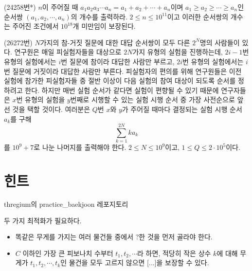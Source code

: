 \begin{problem}
    (24258번*) $n$이 주어질 때 $a_1 a_2 a_3 \cdots a_n = a_1 + a_2 + \cdots + a_n$이며 $a_1 \geq a_2 \geq \cdots \geq a_n$인 순서쌍 $(a_1, a_2, \cdots, a_n)$의 개수를 출력하라. $2 \leq n \leq 10^{11}$이고 이러한 순서쌍의 개수는 주어진 조건에서 $10^{18}$개 미만임이 보장된다.
\end{problem}

\begin{problem}
    (26272번) $N$가지의 참-거짓 질문에 대한 대답 순서쌍이 모두 다른 $2^N$명의 사람들이 있다. 연구원은 매일 피실험자들을 대상으로 $2N$가지 유형의 실험을 진행하는데, $2i-1$번 유형의 실험에서는 $i$번 질문에 참이라 대답한 사람만 부르고, $2i$번 유형의 실험에서는 $i$번 질문에 거짓이라 대답한 사람만 부른다. 피실험자의 편의를 위해 연구원들은 이전 실험에 참가한 피실험자들 중 절반 이상이 다음 실험의 참여 대상이 되도록 순서를 정하려고 한다. 하지만 매번 실험 순서가 같다면 실험이 편향될 수 있기 때문에 연구자들은 $x$번 유형의 실험을 $y$번째로 시행할 수 있는 실험 시행 순서 중 가장 사전순으로 앞선 것을 택할 것이다. 여러분은 $Q$번 $x$와 $y$가 주어질 때마다 결정되는 실험 시행 순서 $a_k$를 구해 
    $$\sum_{k=1}^{2N} {ka_k}$$
    를 $10^9 + 7$로 나눈 나머지를 출력해야 한다. $2 \leq N \leq 10^9$이고, $1 \leq Q \leq 2\cdot10^5$이다.
\end{problem}

\newpage

\section{힌트}

\begin{hint}

\end{hint}

\begin{hint}

\end{hint}

\begin{hint}

\end{hint}

\begin{hint}
    thregium의 practice\_baekjoon 레포지토리
\end{hint}

\begin{hint}
    두 가지 최적화가 필요하다.
    \begin{itemize}
        \item 똑같은 무게를 가지는 여러 물건들 중에서 ?한 것을 먼저 골라야 한다.
        \item $C$ 이하인 가장 큰 피보나치 수부터 $t_1, t_2, \cdots$라 하면, 적당히 작은 상수 $k$에 대해 무게가 $t_1, t_2, \cdots, t_k$인 물건을 모두 고르지 않으면 [...]을 보장할 수 있다.
    \end{itemize}
\end{hint}

